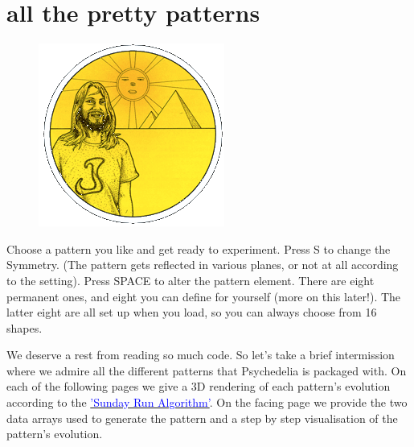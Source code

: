 \chapter{all the pretty patterns} 
\label{sec:patterns}
\rhead[]{\leftmark}
\lstset{style=6502Style}
\lstset{ 
   aboveskip=5pt,
   belowskip=0pt,
}

\begin{definition}
\setlength{\intextsep}{0pt}%
\setlength{\columnsep}{3pt}%
\begin{figure}
\includegraphics[width=\linewidth]{src/callout/psych.png} 
\end{figure}
\small
Choose a pattern you like and get ready to
experiment. Press S to change the Symmetry. (The pattern gets
reflected in various planes, or not at all according to the setting).
Press SPACE to alter the pattern element. There are eight
permanent ones, and eight you can define for yourself (more on
this later!). The latter eight are all set up when you load, so you can
always choose from 16 shapes.
\end{definition}

We deserve a rest from reading so much code. So let's take a brief intermission where
we admire all the different patterns that Psychedelia is packaged with. On each of the following
pages we give a 3D rendering of each pattern's evolution according to the
\hyperref[sec:listing_pattern]{\textcolor{blue}{'Sunday Run Algorithm'}}.
On the facing page we provide the two data arrays used to generate the pattern and a step by step
visualisation of the pattern's evolution.

